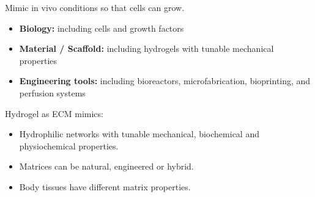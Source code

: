 Mimic in vivo conditions so that cells can grow.
\begin{itemize}
    \item \textbf{Biology:} including cells and growth factors
    \item \textbf{Material / Scaffold:} including hydrogels with tunable mechanical properties
    \item \textbf{Engineering tools:} including bioreactors, microfabrication, bioprinting, and perfusion systems
\end{itemize}
\vspace{2mm}
Hydrogel as ECM mimics:
\begin{itemize}
    \item Hydrophilic networks with tunable mechanical, biochemical and physiochemical properties.
    \item Matrices can be natural, engineered or hybrid.
    \item Body tissues have different matrix properties.
\end{itemize}